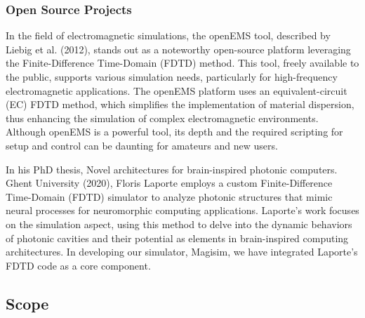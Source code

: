 \documentclass[11pt, a4paper, titlepage]{article}
\begin{document}
\subsubsection{Open Source Projects}
In the field of electromagnetic simulations, the openEMS tool, described by Liebig et al. (2012)\cite{liebig12}, stands out as a noteworthy open-source platform leveraging the Finite-Difference Time-Domain (FDTD) method. This tool, freely available to the public, supports various simulation needs, particularly for high-frequency electromagnetic applications. The openEMS platform uses an equivalent-circuit (EC) FDTD method, which simplifies the implementation of material dispersion, thus enhancing the simulation of complex electromagnetic environments. Although openEMS is a powerful tool, its depth and the required scripting for setup and control can be daunting for amateurs and new users.

In his PhD thesis, Novel architectures for brain-inspired photonic computers. Ghent University (2020)\cite{laporte20}, Floris Laporte employs a custom Finite-Difference Time-Domain (FDTD) simulator to analyze photonic structures that mimic neural processes for neuromorphic computing applications. Laporte's work focuses on the simulation aspect, using this method to delve into the dynamic behaviors of photonic cavities and their potential as elements in brain-inspired computing architectures. In developing our simulator, Magisim, we have integrated Laporte's FDTD code as a core component.


\subsection{Scope}


\end{document}
